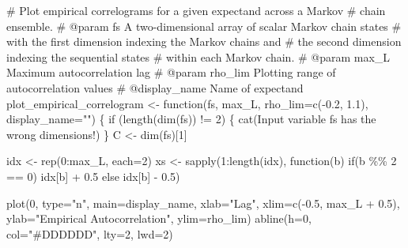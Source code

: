\documentclass[
  letterpaper,
  DIV=11,
  numbers=noendperiod]{scrartcl}
\newenvironment{Shaded}{\begin{snugshade}}{\end{snugshade}}
\newcommand{\AttributeTok}[1]{\textcolor[rgb]{0.40,0.45,0.13}{#1}}
\newcommand{\CommentTok}[1]{\textcolor[rgb]{0.37,0.37,0.37}{#1}}
\newcommand{\ControlFlowTok}[1]{\textcolor[rgb]{0.00,0.23,0.31}{#1}}
\newcommand{\DecValTok}[1]{\textcolor[rgb]{0.68,0.00,0.00}{#1}}
\newcommand{\FloatTok}[1]{\textcolor[rgb]{0.68,0.00,0.00}{#1}}
\newcommand{\FunctionTok}[1]{\textcolor[rgb]{0.28,0.35,0.67}{#1}}
\newcommand{\NormalTok}[1]{\textcolor[rgb]{0.00,0.23,0.31}{#1}}
\newcommand{\OtherTok}[1]{\textcolor[rgb]{0.00,0.23,0.31}{#1}}
\newcommand{\SpecialCharTok}[1]{\textcolor[rgb]{0.37,0.37,0.37}{#1}}
\newcommand{\StringTok}[1]{\textcolor[rgb]{0.13,0.47,0.30}{#1}}
\begin{document}
\begin{Shaded}
\begin{Highlighting}[]
\CommentTok{\# Plot empirical correlograms for a given expectand across a Markov }
\CommentTok{\# chain ensemble.}
\CommentTok{\# @param fs A two{-}dimensional array of scalar Markov chain states }
\CommentTok{\#           with the first dimension indexing the Markov chains and }
\CommentTok{\#           the second dimension indexing the sequential states }
\CommentTok{\#           within each Markov chain.}
\CommentTok{\# @param max\_L Maximum autocorrelation lag}
\CommentTok{\# @param rho\_lim Plotting range of autocorrelation values}
\CommentTok{\# @display\_name Name of expectand}
\NormalTok{plot\_empirical\_correlogram }\OtherTok{\textless{}{-}} \ControlFlowTok{function}\NormalTok{(fs,}
\NormalTok{                                       max\_L,}
                                       \AttributeTok{rho\_lim=}\FunctionTok{c}\NormalTok{(}\SpecialCharTok{{-}}\FloatTok{0.2}\NormalTok{, }\FloatTok{1.1}\NormalTok{),}
                                       \AttributeTok{display\_name=}\StringTok{""}\NormalTok{) \{}
  \ControlFlowTok{if}\NormalTok{ (}\FunctionTok{length}\NormalTok{(}\FunctionTok{dim}\NormalTok{(fs)) }\SpecialCharTok{!=} \DecValTok{2}\NormalTok{) \{}
    \FunctionTok{cat}\NormalTok{(}\StringTok{\textquotesingle{}Input variable \textasciigrave{}fs\textasciigrave{} has the wrong dimensions!\textquotesingle{}}\NormalTok{)}
\NormalTok{  \}}
\NormalTok{  C }\OtherTok{\textless{}{-}} \FunctionTok{dim}\NormalTok{(fs)[}\DecValTok{1}\NormalTok{]}
  
\NormalTok{  idx }\OtherTok{\textless{}{-}} \FunctionTok{rep}\NormalTok{(}\DecValTok{0}\SpecialCharTok{:}\NormalTok{max\_L, }\AttributeTok{each=}\DecValTok{2}\NormalTok{)}
\NormalTok{  xs }\OtherTok{\textless{}{-}} \FunctionTok{sapply}\NormalTok{(}\DecValTok{1}\SpecialCharTok{:}\FunctionTok{length}\NormalTok{(idx), }\ControlFlowTok{function}\NormalTok{(b) }\ControlFlowTok{if}\NormalTok{(b }\SpecialCharTok{\%\%} \DecValTok{2} \SpecialCharTok{==} \DecValTok{0}\NormalTok{) idx[b] }\SpecialCharTok{+} \FloatTok{0.5}
                                          \ControlFlowTok{else}\NormalTok{ idx[b] }\SpecialCharTok{{-}} \FloatTok{0.5}\NormalTok{)}

  \FunctionTok{plot}\NormalTok{(}\DecValTok{0}\NormalTok{, }\AttributeTok{type=}\StringTok{"n"}\NormalTok{, }\AttributeTok{main=}\NormalTok{display\_name,}
       \AttributeTok{xlab=}\StringTok{"Lag"}\NormalTok{, }\AttributeTok{xlim=}\FunctionTok{c}\NormalTok{(}\SpecialCharTok{{-}}\FloatTok{0.5}\NormalTok{, max\_L }\SpecialCharTok{+} \FloatTok{0.5}\NormalTok{),}
       \AttributeTok{ylab=}\StringTok{"Empirical Autocorrelation"}\NormalTok{, }\AttributeTok{ylim=}\NormalTok{rho\_lim)}
  \FunctionTok{abline}\NormalTok{(}\AttributeTok{h=}\DecValTok{0}\NormalTok{, }\AttributeTok{col=}\StringTok{"\#DDDDDD"}\NormalTok{, }\AttributeTok{lty=}\DecValTok{2}\NormalTok{, }\AttributeTok{lwd=}\DecValTok{2}\NormalTok{)}


\end{Highlighting}
\end{Shaded}
\end{document}
